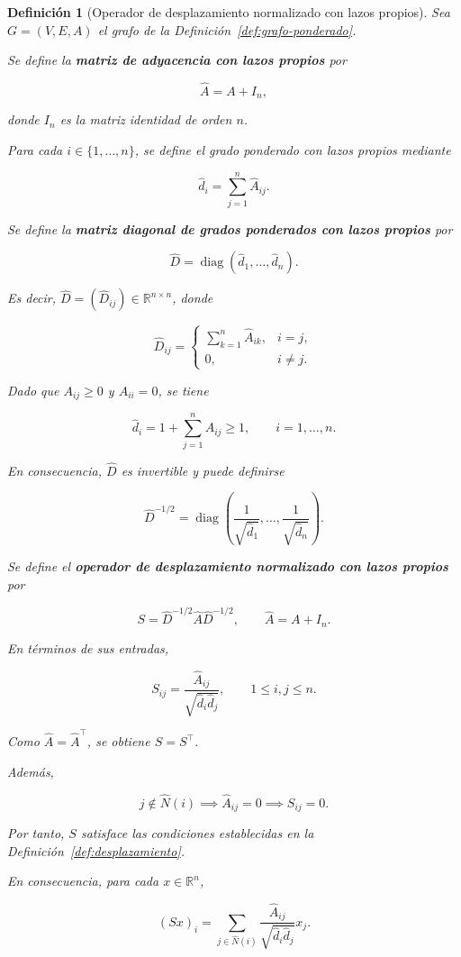 \documentclass[a4paper,openany,oneside,10pt]{report}
\theoremstyle{pnlTeorema}
\theoremstyle{pnlDefinicion}
\newtheorem{definicion}{Definición}[section]
\theoremstyle{pnlObservacion}
\begin{document}
\begin{definicion}[Operador de desplazamiento normalizado con lazos propios]\label{def:desplazamiento-normalizado}
Sea \(G=(V,E,A)\) el grafo de la Definición~\ref{def:grafo-ponderado}.

Se define la \textbf{matriz de adyacencia con lazos propios} por

\[
\widehat A=A+I_n,
\]

donde \(I_n\) es la matriz identidad de orden \(n\).

Para cada \(i\in\{1,\ldots,n\}\), se define el grado ponderado con lazos propios mediante

\[
\widehat d_i=\sum_{j=1}^n\widehat A_{ij}.
\]

Se define la \textbf{matriz diagonal de grados ponderados con lazos propios} por

\[
\widehat D=\operatorname{diag}
(\widehat d_1,\ldots,\widehat d_n).
\]

Es decir, \(\widehat D=(\widehat D_{ij})\in\mathbb R^{n\times n}\), donde

\[
\widehat D_{ij}=
\begin{cases}
\displaystyle\sum_{k=1}^n\widehat A_{ik},&i=j,\\[6pt]
0,&i\ne j.
\end{cases}
\]

Dado que \(A_{ij}\ge0\) y \(A_{ii}=0\), se tiene

\[
\widehat d_i
=1+\sum_{j=1}^n A_{ij}
\ge1,
\qquad i=1,\ldots,n.
\]

En consecuencia, \(\widehat D\) es invertible y puede definirse

\[
\widehat D^{-1/2}
=
\operatorname{diag}\left(
\frac1{\sqrt{\widehat d_1}},
\ldots,
\frac1{\sqrt{\widehat d_n}}
\right).
\]

Se define el \textbf{operador de desplazamiento normalizado con lazos propios} por

\begin{equation}\label{eq:desplazamiento-normalizado}
S=\widehat D^{-1/2}\widehat A\widehat D^{-1/2},
\qquad
\widehat A=A+I_n.
\end{equation}

En términos de sus entradas,

\[
S_{ij}
=
\frac{\widehat A_{ij}}
{\sqrt{\widehat d_i\widehat d_j}},
\qquad 1\le i,j\le n.
\]

Como \(\widehat A=\widehat A^\top\), se obtiene \(S=S^\top\).

Además,

\[
j\notin\widehat N(i)
\implies \widehat A_{ij}=0
\implies S_{ij}=0.
\]

Por tanto, \(S\) satisface las condiciones establecidas en la Definición~\ref{def:desplazamiento}.

En consecuencia, para cada \(x\in\mathbb R^n\),

\[
(Sx)_i=
\sum_{j\in\widehat N(i)}
\frac{\widehat A_{ij}}
{\sqrt{\widehat d_i\widehat d_j}}x_j.
\]
\end{definicion}
\end{document}

